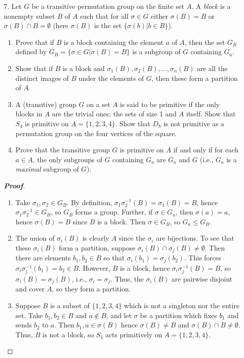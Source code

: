 \documentclass[12pt,leqno]{book}
\theoremstyle{definition}
\newenvironment{Proof}{\begin{proof}[\textnormal{\textbf{Proof}}]}{\end{proof}}
\begin{document}
\begin{enumerate}
 \item [7.] Let $G$ be a transitive permutation group on the finite set $A$. A \textit{block} is a nonempty subset $B$ of $A$ such that for all $\sigma\in G$ either $\sigma(B)=B$ or $\sigma(B)\cap B=\emptyset$ (here $\sigma(B)$ is the set $\{\sigma(b)|b\in B\}$).
  \begin{enumerate}
   \item Prove that if $B$ is a block containing the element $a$ of $A$, then the set $G_B$ defined by $G_B=\{\sigma\in G|\sigma(B)=B\}$ is a subgroup of $G$ containing $G_a$.
   \item Show that if $B$ is a block and $\sigma_1(B),\sigma_2(B),\hdots,\sigma_n(B)$ are all the distinct images of $B$ under the elements of $G$, then these form a partition of $A$.
   \item A (transitive) group $G$ on a set $A$ is said to be primitive if the only blocks in $A$ are the trivial ones: the sets of size 1 and $A$ itself. Show that $S_4$ is primitive on $A=\{1,2,3,4\}$. Show that $D_8$ is not primitive as a permutation group on the four vertices of the square.
   \item Prove that the transitive group $G$ is primitive on $A$ if and only if for each $a\in A$, the only subgroups of $G$ containing $G_a$ are $G_a$ and $G$ (i.e., $G_a$ is a \textit{maximal} subgroup of $G$).
  \end{enumerate}
\begin{Proof}\indent
 \begin{enumerate}
  \item Take $\sigma_1,\sigma_2\in G_B$. By definition, $\sigma_1\sigma_2^{-1}(B)=\sigma_1(B)=B$, hence $\sigma_1\sigma_2^{-1}\in G_B$, so $G_B$ forms a group. Further, if $\sigma\in G_a$, then $\sigma(a)=a$, hence $\sigma(B)=B$ since $B$ is a block. Then $\sigma\in G_B$, so $G_a\leq G_B$.
  \item The union of $\sigma_i(B)$ is clearly $A$ since the $\sigma_i$ are bijections. To see that these $\sigma_i(B)$ form a partition, suppose $\sigma_i(B)\cap\sigma_j(B)\not=\emptyset$. Then there are elements $b_1,b_2\in B$ so that $\sigma_i(b_1)=\sigma_j(b_2)$. This forces $\sigma_i\sigma_j^{-1}(b_1)=b_2\in B$. However, $B$ is a block, hence $\sigma_i\sigma_j^{-1}(B)=B$, so $\sigma_i(B)=\sigma_j(B)$, i.e., $\sigma_i=\sigma_j$. Thus, the $\sigma_i(B)$ are pairwise disjoint and cover $A$, so they form a partition.
  \item Suppose $B$ is a subset of $\{1,2,3,4\}$ which is not a singleton nor the entire set. Take $b_1,b_2\in B$ and $a\notin B$, and let $\sigma$ be a partition which fixes $b_1$ and sends $b_2$ to $a$. Then $b_1,a\in\sigma(B)$ hence $\sigma(B)\not=B$ and $\sigma(B)\cap B\not=\emptyset$. Thus, $B$ is not a block, so $S_4$ acts primitively on $A=\{1,2,3,4\}$. 


\end{enumerate}
\end{Proof}
\end{enumerate}
\end{document}
